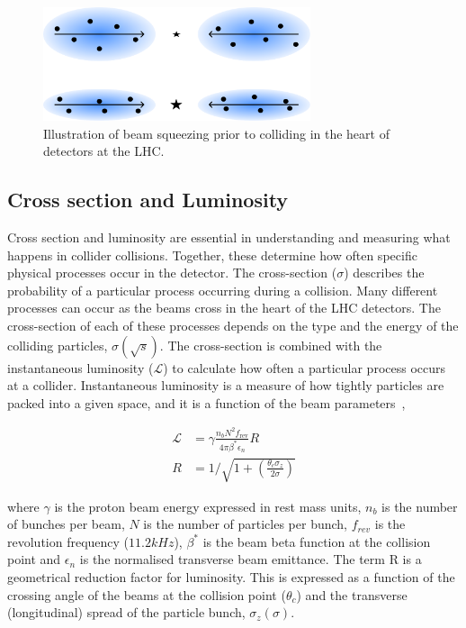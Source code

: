 \begin{figure}[h]
\centering
\includegraphics[width= 0.7\textwidth]{Figures/Chapter3/LHC_BeamSqueeze.pdf}
\caption{Illustration of beam squeezing prior to colliding in the heart of detectors at the LHC.}
\label{Figure:Chapter3_LHC_BeamSqueeze}
\end{figure}

\subsection{Cross section and Luminosity}

Cross section and luminosity are essential in understanding and measuring what happens in collider collisions. Together, these determine how often specific physical processes occur in the detector. The cross-section ($\sigma$) describes the probability of a particular process occurring during a collision. Many different processes can occur as the beams cross in the heart of the LHC detectors. The cross-section of each of these processes depends on the type and the energy of the colliding particles, $\sigma(\sqrt{s})$. The cross-section is combined with the instantaneous luminosity ($\mathscr{L}$) to calculate how often a particular process occurs at a collider. Instantaneous luminosity is a measure of how tightly particles are packed into a given space, and it is a function of the beam parameters~\cite{LHC_HL},

\begin{equation}
\begin{aligned}
    \mathscr{L} &= \gamma \frac{n_b N^2 f_{\text{rev}}}{4\pi \beta^* \epsilon_n} R \\
    R &= 1 / \sqrt{1 + \left( \frac{\theta_c \sigma_z}{2\sigma} \right) }
\end{aligned}
\end{equation}

where $\gamma$ is the proton beam energy expressed in rest mass units, $n_b$ is the number of bunches per beam, $N$ is the number of particles per bunch, $f_{rev}$ is the revolution frequency ($11.2\unit{kHz}$), $\beta^*$ is the beam beta function at the collision point and $\epsilon_n$ is the normalised transverse beam emittance. The term R is a geometrical reduction factor for luminosity. This is expressed as a function of the crossing angle of the beams at the collision point ($\theta_c$) and the transverse (longitudinal) spread of the particle bunch, $\sigma_z(\sigma)$. 


